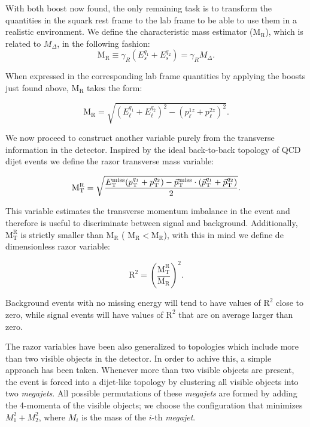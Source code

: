 With both boost now found, the only remaining task is to transform the
quantities in the squark rest frame to the lab frame to be able to use
them in a realistic environment. We define the characteristic mass
estimator ($\mathrm{M_{R}}$), which is
related to $M_{\Delta}$, in the following fashion: 
\begin{equation}
\label{eq:MRdef}
\mathrm{M_{R}} \equiv \gamma_{R}(E^{q_{1}}_{s} + E^{q_{2}}_{s}) =
  \gamma_{R} M_{\Delta}.
\end{equation} 

When expressed in the corresponding lab frame quantities by applying
the boosts just found above, $\mathrm{M_{R}}$ takes the form:

 \begin{equation}
\label{eq:MRlabF}
\mathrm{M_{R}} = \sqrt{(E^{q_{1}}_{\ell} + E^{q_{2}}_{\ell})^{2} - (p^{1z}_{\ell} + p^{2z}_{\ell})^{2}}.
\end{equation} 


We now proceed to construct another variable purely from the
transverse information in the detector. Inspired by the ideal
back-to-back topology of QCD dijet events we define the razor
transverse mass variable:

\begin{equation}
\label{eq:MRTdef}
\mathrm{M^{R}_{T}} =
\sqrt{\frac{E^{\mathrm{miss}}_{\mathrm{T}}(p^{q_{1}}_{\mathrm{T}}+p^{q_{2}}_{\mathrm{T}})
    - {\vec p}_{\mathrm{T}}^{\kern1pt\text{miss}} \cdot (\vec{p}^{q_{1}}_{\mathrm{T}} + \vec{p}^{q_{2}}_{\mathrm{T}})}{2}}.
\end{equation} 

This variable estimates the transverse momentum imbalance in the event
and therefore is useful to discriminate between signal and
background. Additionally, $\mathrm{M^{R}_{T}}$ is strictly smaller
than $\mathrm{M_{R}}$ ( $\mathrm{M_{R}} < \mathrm{M_{R}}$), with this
in mind we define de dimensionless razor variable:

\begin{equation}
\label{eq:R2}
\mathrm{R^{2}} = \left(\frac{\mathrm{M^{R}_{T}}}{\mathrm{M_{R}} }\right)^{2}.
\end{equation}

Background events with no missing energy will tend to have values of $\mathrm{R^{2}}$ close
to zero, while signal events will have values of $\mathrm{R^{2}}$
that are on average larger than zero.


The razor variables have been also generalized to topologies which
include more than two visible objects in the detector. In order to
achive this, a simple approach has been taken. Whenever more than two
visible objects are present, the event is forced into a dijet-like topology
by clustering all visible objects into two \textit{megajets}. All
possible permutations of these \textit{megajets} are formed
by adding the 4-momenta of the visible objects; we choose the configuration
that minimizes $M_{1}^{2} + M_{2}^{2}$, where $M_{i}$ is the mass
of the $i$-th \textit{megajet}.

